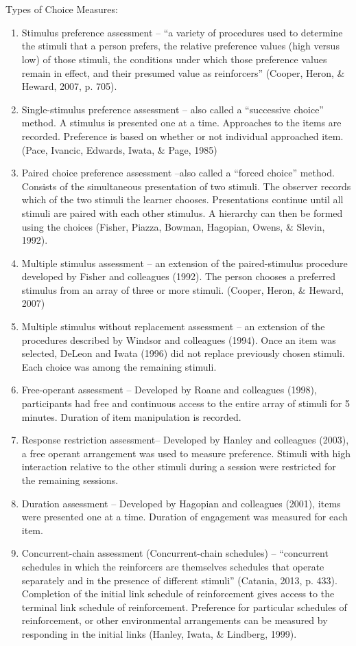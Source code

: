 \section{\fouraFourteen{}}
Types of Choice Measures:
\begin{enumerate}
\item Stimulus preference assessment – ``a variety of procedures used to determine the stimuli that a person prefers, the relative preference values (high versus low) of those stimuli, the conditions under which those preference values remain in effect, and their presumed value as reinforcers'' (Cooper, Heron, \& Heward, 2007, p. 705).
\item Single-stimulus preference assessment – also called a ``successive choice'' method. A stimulus is presented one at a time. Approaches to the items are recorded. Preference is based on whether or not individual approached item. (Pace, Ivancic, Edwards, Iwata, \& Page, 1985)
\item Paired choice preference assessment –also called a ``forced choice'' method. Consists of the simultaneous presentation of two stimuli. The observer records which of the two stimuli the learner chooses. Presentations continue until all stimuli are paired with each other stimulus. A hierarchy can then be formed using the choices (Fisher, Piazza, Bowman, Hagopian, Owens, \& Slevin, 1992).
\item Multiple stimulus assessment – an extension of the paired-stimulus procedure developed by Fisher and colleagues (1992). The person chooses a preferred stimulus from an array of three or more stimuli. (Cooper, Heron, \& Heward, 2007)
\item Multiple stimulus without replacement assessment – an extension of the procedures described by Windsor and colleagues (1994). Once an item was selected, DeLeon and Iwata (1996) did not replace previously chosen stimuli. Each choice was among the remaining stimuli. 
\item Free-operant assessment – Developed by Roane and colleagues (1998), participants had free and continuous access to the entire array of stimuli for 5 minutes. Duration of item manipulation is recorded. 
\item Response restriction assessment– Developed by Hanley and colleagues (2003), a free operant arrangement was used to measure preference. Stimuli with high interaction relative to the other stimuli during a session were restricted for the remaining sessions.
\item Duration assessment – Developed by Hagopian and colleagues (2001), items were presented one at a time. Duration of engagement was measured for each item.
\item Concurrent-chain assessment (Concurrent-chain schedules) – ``concurrent schedules in which the reinforcers are themselves schedules that operate separately and in the presence of different stimuli'' (Catania, 2013, p. 433). Completion of the initial link schedule of reinforcement gives access to the terminal link schedule of reinforcement. Preference for particular schedules of reinforcement, or other environmental arrangements can be measured by responding in the initial links (Hanley, Iwata, \& Lindberg, 1999).
\end{enumerate}
% 
